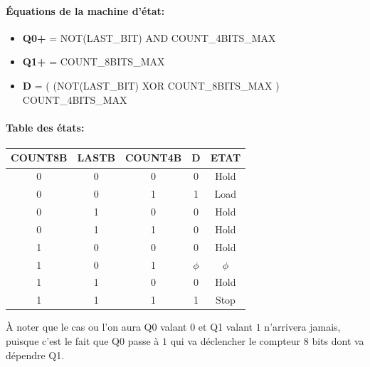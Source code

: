 \documentclass[a4paper]{article} %
\begin{document}
\begin{tcolorbox}[colframe=Monokaimagenta,colback=white]
\paragraph{Équations de la machine d'état:}
\begin{itemize}
    \item     \textbf{Q0+} = NOT(LAST\_BIT) AND COUNT\_4BITS\_MAX
    \item     \textbf{Q1+} = COUNT\_8BITS\_MAX
    \item     \textbf{D} = ( (NOT(LAST\_BIT)  XOR COUNT\_8BITS\_MAX ) COUNT\_4BITS\_MAX
\end{itemize}

\paragraph{Table des états:}
\begin{center}
    \begin{tabular}{|ccc||c|c|}
    \hline
    COUNT8B & LASTB & COUNT4B & D      & ETAT\\
    \hline
    0       & 0     & 0       & 0      & Hold \\
    0       & 0     & 1       & 1      & Load \\
    0       & 1     & 0       & 0      & Hold \\ 
    0       & 1     & 1       & 0      & Hold \\
    1       & 0     & 0       & 0      & Hold \\
    1       & 0     & 1       & $\phi$ & $\phi$ \\
    1       & 1     & 0       & 0      & Hold \\
    1       & 1     & 1       & 1      & Stop \\
    \hline
    \end{tabular}
\end{center}
À noter que le cas ou l'on aura Q0 valant $0$ et Q1 valant $1$ n'arrivera jamais, puisque c'est le fait que Q0 passe à $1$ qui va déclencher le compteur 8 bits dont va dépendre Q1.


\end{tcolorbox}
\end{document}
